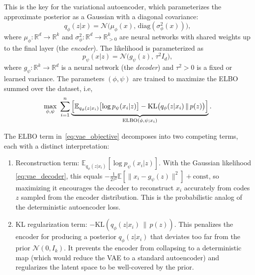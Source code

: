 This is the key for the variational autoencoder, which parameterizes the approximate posterior as a
Gaussian with a diagonal covariance:
\begin{equation}
    q_\phi(z | x) = \mathcal{N}\bigl(\mu_\phi(x),\, 
    \mathrm{diag}(\sigma_\phi^2(x))\bigr),
    \label{eq:vae_encoder}
\end{equation}
where $\mu_\phi : \mathbb{R}^d \to \mathbb{R}^k$ and $\sigma_\phi^2 : 
\mathbb{R}^d \to \mathbb{R}^k_{>0}$ are neural networks with shared weights 
up to the final layer (the \emph{encoder}). The likelihood is parameterized as
\begin{equation}
    p_\psi(x | z) = \mathcal{N}\bigl(g_\psi(z),\, \tau^2 I_d\bigr),
    \label{eq:vae_decoder}
\end{equation}
where $g_\psi : \mathbb{R}^k \to \mathbb{R}^d$ is a neural network 
(the \emph{decoder}) and $\tau^2 > 0$ is a fixed or learned variance. The 
parameters $(\phi, \psi)$ are trained to maximize the ELBO summed over the 
dataset, i.e,
\begin{equation}
    \max_{\phi,\psi} \,\, \sum_{i=1}^n \underbrace{\Bigl[
        \mathbb{E}_{q_\phi(z | x_i)}\bigl[\log p_\psi(x_i | z)\bigr]
        - \text{KL}\bigl(q_\phi(z | x_i) \,\|\, p(z)\bigr)
    \Bigr]}_{\mathrm{ELBO}(\phi, \psi; x_i)}.
    \label{eq:vae_objective}
\end{equation}

The ELBO term in~\eqref{eq:vae_objective} decomposes into two competing terms,
each with a distinct interpretation:

\begin{enumerate}
    \item Reconstruction term: 
    $\mathbb{E}_{q_\phi(z | x_i)}[\log p_\psi(x_i | z)]$. 
    With the Gaussian likelihood \eqref{eq:vae_decoder}, this equals 
    $-\frac{1}{2\tau^2}\mathbb{E}[\|x_i - g_\psi(z)\|^2] + \mathrm{const}$, 
    so maximizing it encourages the decoder to reconstruct $x_i$ accurately 
    from codes $z$ sampled from the encoder distribution. This is the 
    probabilistic analog of the deterministic autoencoder loss.

    \item KL regularization term: 
    $-\text{KL}(q_\phi(z | x_i) \,\|\, p(z))$. 
    This penalizes the encoder for producing a posterior $q_\phi(z | x_i)$ 
    that deviates too far from the prior $\mathcal{N}(0, I_k)$. It prevents 
    the encoder from collapsing to a deterministic map (which would reduce 
    the VAE to a standard autoencoder) and regularizes the latent space to 
    be well-covered by the prior.
\end{enumerate}

